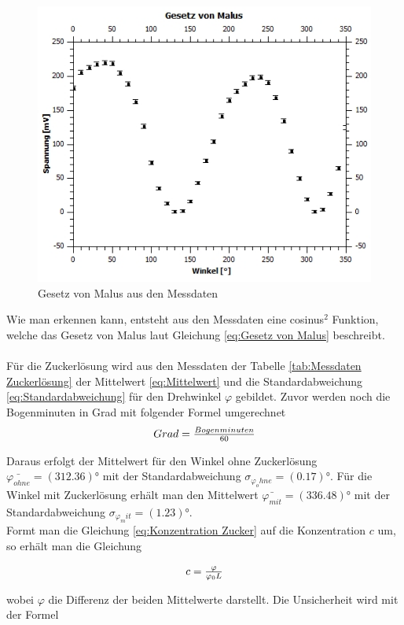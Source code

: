 \documentclass[12pt,a4paper,twoside]{article}
\begin{document}
\begin{figure}[H]
    \centering
    \includegraphics[width=0.6\linewidth]{nudes/malusplot.jpg}
    \caption{Gesetz von Malus aus den Messdaten}
    \label{fig:malus beweis}
\end{figure}

\noindent
Wie man erkennen kann, entsteht aus den Messdaten eine cosinus$^2$ Funktion, welche das Gesetz von Malus laut Gleichung \ref{eq:Gesetz von Malus} beschreibt.  
\\
\\
Für die Zuckerlösung wird aus den Messdaten der Tabelle \ref{tab:Messdaten Zuckerlösung} der Mittelwert \ref{eq:Mittelwert} und die Standardabweichung \ref{eq:Standardabweichung} für den Drehwinkel $\varphi$ gebildet. Zuvor werden noch die Bogenminuten in Grad mit folgender Formel umgerechnet
\begin{equation}
    \label{eq:Bogenminuten umrechnen}
    \centerline{$Grad = \frac{Bogenminuten}{60}$}
\end{equation}

\noindent
Daraus erfolgt der Mittelwert für den Winkel ohne Zuckerlösung $\bar{\varphi_{ohne}} = (312.36)$° mit der Standardabweichung $\sigma_{\varphi_ohne} = (0.17)$°. 
Für die Winkel mit Zuckerlösung erhält man den Mittelwert $\bar{\varphi_{mit}} = (336.48)$° mit der Standardabweichung $\sigma_{\varphi_mit} = (1.23)$°.
\\
Formt man die Gleichung \ref{eq:Konzentration Zucker} auf die Konzentration $c$ um, so erhält man die Gleichung

\begin{equation}
    \label{eq:Konzentration Zucker umgeformt}
    \centerline{$c = \frac{\varphi}{\varphi_0 L}$}
\end{equation}
 
\noindent
wobei $\varphi$ die Differenz der beiden Mittelwerte darstellt. Die Unsicherheit wird mit der Formel 
\end{document}
